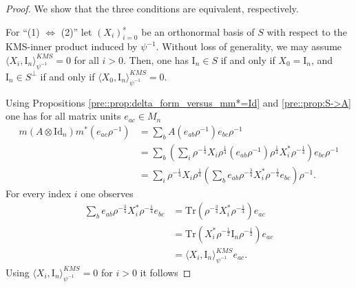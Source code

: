 \documentclass{amsart}
\newcommand{\comments}[1]{}
\begin{document}
\begin{proof}
    We show that the three conditions are equivalent, respectively. 
    
    For ``(1) $\Leftrightarrow$ (2)'' let $(X_i)_{i=0}^s$ be an orthonormal basis of $S$ with respect to the KMS-inner product induced by $\psi^{-1}$. Without loss of generality, we may assume $\langle X_i, \mathrm{I}_n \rangle_{\psi^{-1}}^{KMS} = 0$ for all $i > 0$. Then, one has
    $\mathrm{I}_n \in S$ if and only if $X_0 = \mathrm{I}_n$, and $\mathrm{I}_n \in S^\bot$ if and only if $\langle X_0, \mathrm{I}_n \rangle_{\psi^{-1}}^{KMS} = 0$.
    \comments{
    \begin{align*}
        & \mathrm{I}_n \in S & \Leftrightarrow & \qquad \qquad X_0 = \mathrm{I}_n, \\ %
        & \mathrm{I}_n \in S^\bot & \Leftrightarrow & \qquad \qquad \langle X_0, \mathrm{I}_n \rangle_{\psi^{-1}}^{KMS} = 0. \\
    \end{align*}
    }
    Using Propositions \ref{pre::prop:delta_form_versus_mm*=Id} and \ref{pre::prop:S->A} one has for all matrix units $e_{ac} \in M_n$
    \begin{align*}
        m(A \otimes \mathrm{Id}_n)m^\ast(e_{ac}\rho^{-1})
            &= \sum_{b}  A(e_{ab}\rho^{-1}) e_{bc} \rho^{-1} \\
            &= \sum_b \left( \sum_i \rho^{-\frac{1}{4}} X_i \rho^{\frac{1}{4}} \left( e_{ab} \rho^{-1} \right) \rho^{\frac{1}{4}} X_i^\ast  \rho^{-\frac{1}{4}} \right) e_{bc} \rho^{-1} \\
            &= \sum_i \rho^{-\frac{1}{4}} X_i \rho^{\frac{1}{4}} \left( \sum_b e_{ab} \rho^{-\frac{3}{4}} X_i^\ast  \rho^{-\frac{1}{4}} e_{bc} \right) \rho^{-1}.
    \end{align*}
    For every index $i$ one observes
    \begin{align*}
        \sum_b e_{ab} \rho^{-\frac{3}{4}} X_i^\ast  \rho^{-\frac{1}{4}} e_{bc}
            &=\mathrm{Tr}\left( \rho^{-\frac{3}{4}} X_i^\ast  \rho^{-\frac{1}{4}} \right) e_{ac}\\
            &=\mathrm{Tr}\left(X_i^\ast  \rho^{-\frac{1}{2}} \mathrm{I}_n \rho^{-\frac{1}{2}} \right) e_{ac}\\
            &= \langle X_i, \mathrm{I}_n \rangle_{\psi^{-1}}^{KMS} e_{ac}.
    \end{align*}
    Using $\langle X_i, \mathrm{I}_n \rangle_{\psi^{-1}}^{KMS} = 0$ for $i > 0$ it follows

\end{proof}
\end{document}
